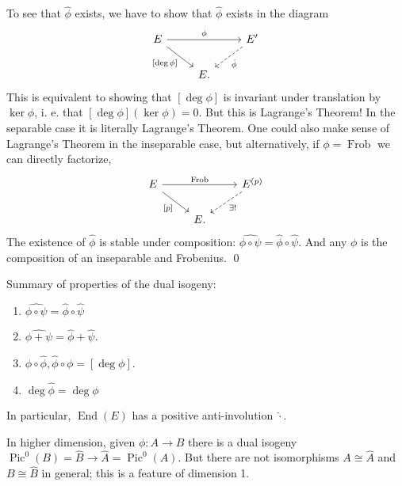 To see that \( \hat{\phi} \) exists, we have to show that \( \hat{\phi} \) exists in the diagram
\[
\begin{tikzcd}
  E \arrow[rr,"\phi"] \arrow[dr,"{[\deg \phi]}"'] & & E' \arrow[dl,dashed,"{\hat{\phi}}"] \\
  & E . & 
\end{tikzcd}
\]
This is equivalent to showing that \( [\deg \phi] \) is invariant under translation by \( \ker \phi \), i. e. that \( [\deg \phi] (\ker \phi) = 0 \).
But this is Lagrange's Theorem!
In the separable case it is literally Lagrange's Theorem.
One could also make sense of Lagrange's Theorem in the inseparable case, but alternatively, if \( \phi = \operatorname{Frob} \) we can directly factorize,
\[
\begin{tikzcd}
  E \arrow[rr,"{\operatorname{Frob}}"] \arrow[dr,"{[p]}"'] & & E^{(p)} \arrow[dl,"{\exists !}",dashed] \\
  & E . & 
\end{tikzcd}
\]
The existence of \( \hat{\phi} \) is stable under composition: \( \widehat{\phi \circ \psi} = \hat{\phi} \circ \hat{\psi} \).
And any \( \phi \) is the composition of an inseparable and Frobenius. \qed

Summary of properties of the dual isogeny:
\begin{enumerate}
\item \( \widehat{\phi \circ \psi} = \hat{\phi} \circ \hat{\psi} \)
\item \( \widehat{\phi + \psi} = \hat{\phi} + \hat{\psi} \).
\item \( \phi \circ \hat{\phi} , \hat{\phi} \circ \phi = [ \deg \phi ] \).
\item \( \deg \hat{\phi} = \deg \phi \)
\end{enumerate}
In particular, \( \operatorname{End}(E) \) has a positive anti-involution \( \hat{\cdot} \).
\begin{remark}
  In higher dimension, given \( \phi \colon A \to B \) there is a dual isogeny \( \operatorname{Pic}^0(B) = \hat{B} \to \hat{A} = \operatorname{Pic}^0(A) \).
  But there are not isomorphisms \( A \cong \hat{A} \) and \( B \cong \hat{B} \) in general; this is a feature of dimension 1.
\end{remark}

